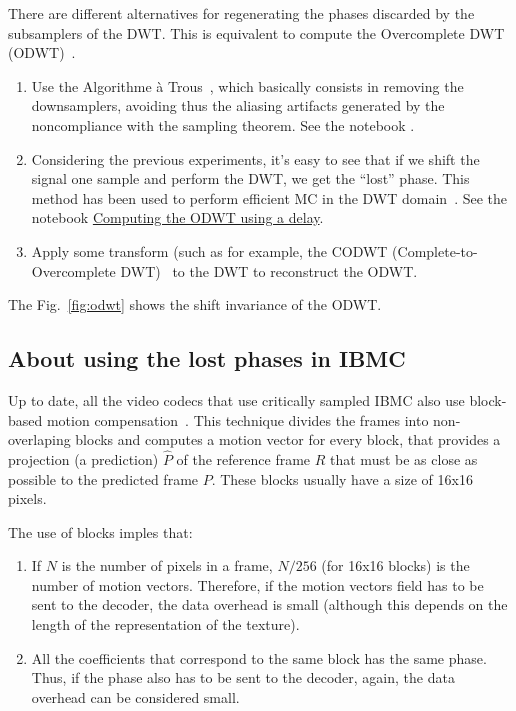 There are different alternatives for regenerating the phases discarded
by the subsamplers of the DWT. This is equivalent to compute the
Overcomplete DWT (ODWT)~\cite{mallat1999wavelet}.
\begin{enumerate}
\item Use the Algorithme \`a Trous~\cite{mallat1999wavelet}, which
  basically consists in removing the downsamplers, avoiding thus the
  aliasing artifacts generated by the noncompliance with the sampling
  theorem. See the notebook
  \href{https://github.com/vicente-gonzalez-ruiz/motion_compensation_dwt_domain/blob/main/regenerating.ipynb}{}.
\item Considering the previous experiments, it's easy to see that if
  we shift the signal one sample and perform the DWT, we get the
  ``lost'' phase. This method has been used to perform efficient MC in
  the DWT domain~\cite{park2000motion,li2001all}. See the notebook
  \href{https://github.com/vicente-gonzalez-ruiz/motion_compensation_dwt_domain/blob/main/ODWT_with_delay.ipynb}{Computing
    the ODWT using a delay}.
\item Apply some transform (such as for example, the CODWT
  (Complete-to-Overcomplete DWT)~\cite{andreopoulos2005complete} to
  the DWT to reconstruct the ODWT.
\end{enumerate}
The Fig.~\ref{fig:odwt} shows the shift invariance of the ODWT.

\subsection{About using the lost phases in IBMC}
Up to date, all the video codecs that use critically sampled IBMC also
use block-based motion compensation~\cite{vruiz__MC}. This technique
divides the frames into non-overlaping blocks and computes a motion
vector for every block, that provides a projection (a prediction)
$\hat{P}$ of the reference frame $R$ that must be as close as possible
to the predicted frame $P$. These blocks usually have a size of 16x16
pixels.

The use of blocks imples that:
\begin{enumerate}
\item If $N$ is the number of pixels in a frame, $N/256$ (for 16x16
  blocks) is the number of motion vectors. Therefore, if the motion
  vectors field has to be sent to the decoder, the data overhead is
  small (although this depends on the length of the representation of
  the texture).
\item All the coefficients that correspond to the same block has the
  same phase. Thus, if the phase also has to be sent to the decoder,
  again, the data overhead can be considered small.
\end{enumerate}

